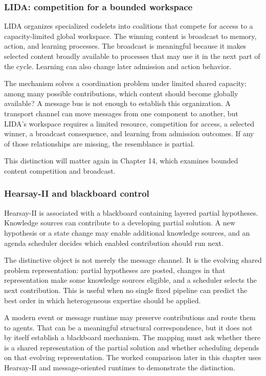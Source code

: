 \subsubsection{LIDA: competition for a bounded workspace}

LIDA organizes specialized codelets into coalitions that compete for access to a capacity-limited global workspace. The winning content is broadcast to memory, action, and learning processes. The broadcast is meaningful because it makes selected content broadly available to processes that may use it in the next part of the cycle. Learning can also change later admission and action behavior.

The mechanism solves a coordination problem under limited shared capacity: among many possible contributions, which content should become globally available? A message bus is not enough to establish this organization. A transport channel can move messages from one component to another, but LIDA's workspace requires a limited resource, competition for access, a selected winner, a broadcast consequence, and learning from admission outcomes. If any of those relationships are missing, the resemblance is partial.

This distinction will matter again in Chapter 14, which examines bounded content competition and broadcast.

\subsubsection{Hearsay-II and blackboard control}

Hearsay-II is associated with a blackboard containing layered partial hypotheses. Knowledge sources can contribute to a developing partial solution. A new hypothesis or a state change may enable additional knowledge sources, and an agenda scheduler decides which enabled contribution should run next.

The distinctive object is not merely the message channel. It is the evolving shared problem representation: partial hypotheses are posted, changes in that representation make some knowledge sources eligible, and a scheduler selects the next contribution. This is useful when no single fixed pipeline can predict the best order in which heterogeneous expertise should be applied.

A modern event or message runtime may preserve contributions and route them to agents. That can be a meaningful structural correspondence, but it does not by itself establish a blackboard mechanism. The mapping must ask whether there is a shared representation of the partial solution and whether scheduling depends on that evolving representation. The worked comparison later in this chapter uses Hearsay-II and message-oriented runtimes to demonstrate the distinction.

